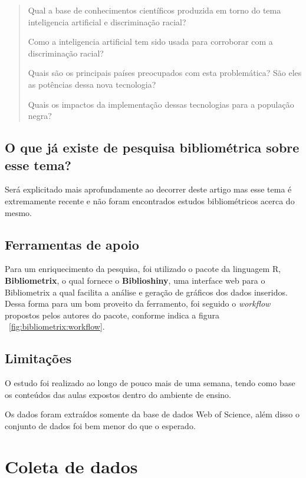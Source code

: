 \begin{quote}

Qual a base de conhecimentos científicos produzida em torno do tema inteligencia artificial e discriminação racial?

Como a inteligencia artificial tem sido usada para corroborar com a discriminação racial? 

Quais são os principais países preocupados com esta problemática?  São eles as potências dessa nova tecnologia?

Quais os impactos da implementação dessas tecnologias para a população negra?

\end{quote}


\subsection{O que já existe de pesquisa bibliométrica sobre esse tema?}

Será explicitado mais aprofundamente ao decorrer deste artigo mas esse tema é extremamente recente e não foram encontrados estudos bibliométricos acerca do mesmo. 

\subsection{Ferramentas de apoio}

Para um enriquecimento da pesquisa, foi utilizado o pacote da linguagem R, \textbf{Bibliometrix}, o qual fornece o \textbf{Biblioshiny}, uma interface web para o Bibliometrix a qual facilita a análise e geração de gráficos dos dados inseridos. Dessa forma para um bom proveito da ferramento, foi seguido o \textit{workflow} propostos pelos autores do pacote, conforme indica a figura ~\ref{fig:bibliometrix:workflow}.

\subsection{Limitações} 
O estudo foi realizado ao longo de pouco mais de uma semana, tendo como base os conteúdos das aulas expostos dentro do ambiente de ensino. 

Os dados foram extraídos somente da base de dados Web of Science, além disso o conjunto de dados foi bem menor do que o esperado.

\section{Coleta de dados}

